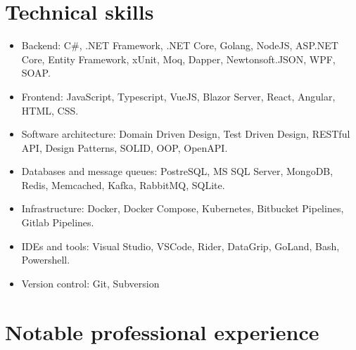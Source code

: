 \documentclass{article}
\begin{document}
\section*{Technical skills}

\begin{itemize}
    \item {
        Backend: C\#, .NET Framework, .NET Core, Golang, NodeJS, ASP.NET Core, Entity Framework, xUnit, Moq, Dapper, Newtonsoft.JSON, WPF, SOAP.
    }
    \item {
        Frontend: JavaScript, Typescript, VueJS, Blazor Server, React, Angular, HTML, CSS.
    }
    \item {
        Software architecture: Domain Driven Design, Test Driven Design, RESTful API, Design Patterns, SOLID, OOP, OpenAPI.
    }
    \item {
        Databases and message queues: PostreSQL, MS SQL Server, MongoDB, Redis, Memcached, Kafka, RabbitMQ, SQLite.
    }
    \item {
        Infrastructure: Docker, Docker Compose, Kubernetes, Bitbucket Pipelines, Gitlab Pipelines.
    }
    \item {
        IDEs and tools: Visual Studio, VSCode, Rider, DataGrip, GoLand, Bash, Powershell.
    }
    \item {
        Version control: Git, Subversion
    }
\end{itemize}

\section*{Notable professional experience}
\end{document}
